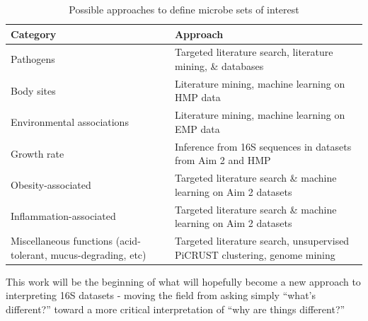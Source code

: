 \documentclass[12pt]{article}
\begin{document}
\begin{table}
\begin{tabular}{|p{6cm}|p{10cm}|}
	\hline
	\textbf{Category} & \textbf{Approach} \\
	\hline
	Pathogens & Targeted literature search, literature mining, \& 
	databases \\
	\hline
	Body sites & Literature mining, machine learning on HMP data \\
	\hline
	Environmental associations & Literature mining, machine learning 
	on EMP data \\
	\hline
	Growth rate & Inference from 16S sequences in datasets from Aim 2 
	and HMP \\
	\hline
	Obesity-associated & Targeted literature search \& machine 
	learning on Aim 2 datasets \\
	\hline
	Inflammation-associated & Targeted literature search \& machine 
	learning on Aim 2 datasets \\
	\hline
	Miscellaneous functions (acid-tolerant, mucus-degrading, etc) & 
	Targeted literature search, unsupervised PiCRUST clustering, 
	genome mining \\
	\hline 
\end{tabular}
\caption{Possible approaches to define microbe sets of interest}\label{tab:microbe_set_categories}
\end{table}



This work will be the beginning of what will hopefully become a new 
approach to interpreting 16S datasets - moving the field from asking 
simply ``what's different?'' toward a more critical interpretation of 
``why are things different?''



\end{document}
